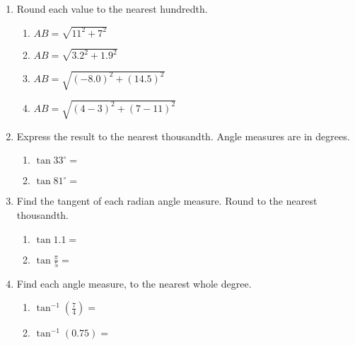 \documentclass[12pt, oneside]{article}
\begin{document}
\begin{enumerate}
\item Round each value to the nearest hundredth. \vspace{.5cm}
  \begin{multicols}{2}
    \begin{enumerate}
      \item $AB=\sqrt{11^2+7^2}$ \vspace{3.5cm}
      \item $AB=\sqrt{3.2^2+1.9^2}$
      \item $AB=\sqrt{(-8.0)^2+(14.5)^2}$ \vspace{3.5cm}
      \item $AB=\sqrt{(4-3)^2+(7-11)^2}$
    \end{enumerate}
  \end{multicols} \vspace{1cm}

\newpage
\item Express the result to the nearest thousandth. Angle measures are in degrees. \vspace{.25cm}
  \begin{multicols}{2}
    \begin{enumerate}
      \item $\displaystyle \tan 33^\circ = $ \vspace{1cm}
      \item $\displaystyle \tan 81^\circ = $
    \end{enumerate}
  \end{multicols} \vspace{1cm}
  
\item Find the tangent of each radian angle measure. Round to the nearest thousandth. \vspace{.25cm}
  \begin{multicols}{2}
    \begin{enumerate}
      \item $\displaystyle \tan 1.1 = $ \vspace{1cm}
      \item $\displaystyle \tan \frac{\pi}{5} = $
    \end{enumerate}
  \end{multicols} \vspace{1cm}

\item Find each angle measure, to the nearest whole degree.\vspace{.25cm}
\begin{multicols}{2}
  \begin{enumerate}
    \item $\displaystyle \tan^{-1} (\frac{7}{4}) = $ \vspace{1cm}
    \item $\tan^{-1} (0.75) =$
  \end{enumerate}
\end{multicols} \vspace{1cm}


\end{enumerate}
\end{document}
